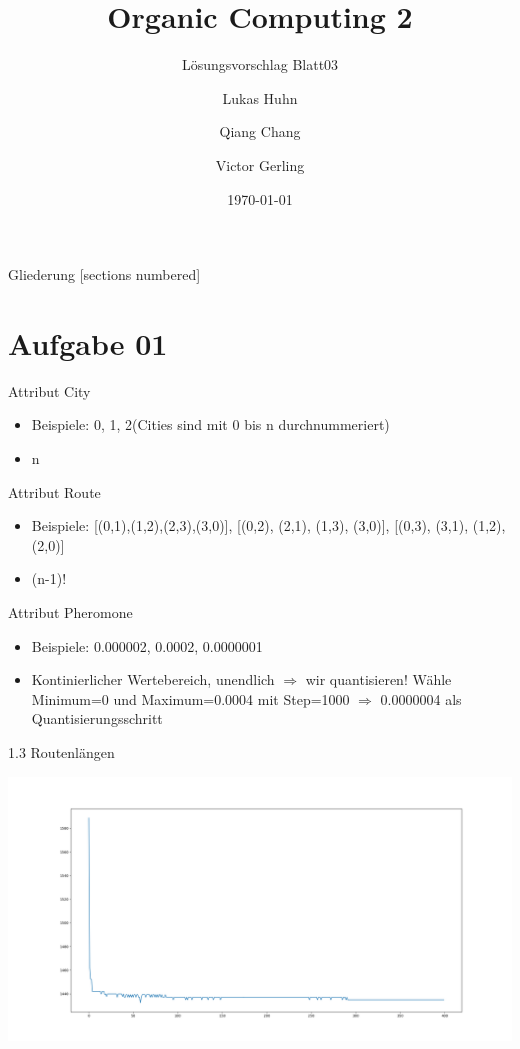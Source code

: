 \documentclass{ocbeameruni}
\title{Organic Computing 2}
\subtitle{Lösungsvorschlag Blatt03}
\date{\today}
\author{Lukas Huhn \and Qiang Chang \and Victor Gerling}
\institute{%
  Universität Augsburg\\
  Institut für Informatik\\
  Lehrstuhl für Organic Computing
}
\begin{document}
\maketitle


\begin{frame}{Gliederung}
  [sections numbered]
  \tableofcontents
\end{frame}


\section{Aufgabe 01}

\begin{frame}{Attribut City}
    \begin{itemize}
    \item Beispiele: 0, 1, 2(Cities sind mit 0 bis n durchnummeriert)
    \item n
    \end{itemize}
\end{frame}

\begin{frame}{Attribut Route}
    \begin{itemize}
    \item Beispiele: [(0,1),(1,2),(2,3),(3,0)], [(0,2), (2,1), (1,3), (3,0)], [(0,3), (3,1), (1,2), (2,0)]
    \item (n-1)!
    \end{itemize}
\end{frame}

\begin{frame}{Attribut Pheromone}
    \begin{itemize}
    \item Beispiele: 0.000002, 0.0002, 0.0000001
    \item Kontinierlicher Wertebereich, unendlich $\Rightarrow$ wir quantisieren! Wähle Minimum=0 und Maximum=0.0004 mit Step=1000
    $\Rightarrow$ 0.0000004 als Quantisierungsschritt
    \end{itemize}
\end{frame}

\begin{frame}{1.3 Routenlängen}
    \begin{center}
    \includegraphics[scale=0.2]{Avg_len_per_iter.png}
    \end{center}
\end{frame}
\end{document}
